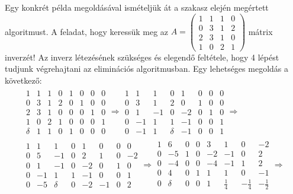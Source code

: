 \documentclass[9pt, a4paper, showtrims]{memoir}
\theoremstyle{plain}
\theoremstyle{remark}
\theoremstyle{definition}
\begin{document}
Egy konkrét példa megoldásával ismételjük át a szakasz elején megértett algoritmust.
A feladat, hogy keressük meg az 
\(
A=
\begin{pmatrix}
    1&1&1&0\\
    0&3&1&2\\
    2&3&1&0\\
    1&0&2&1
\end{pmatrix}
\)
mátrix inverzét!
Az inverz létezésének szükséges és elegendő feltétele, hogy 4 lépést tudjunk végrehajtani az eliminációs algoritmusban.
Egy lehetséges megoldás a következő:
\begin{multline*}
    \begin{array}{cccc|cccc}
        \boxed{1}&1&1&0 & 1&0&0&0\\
        0&3&1&2 & 0&1&0&0\\
        2&3&1&0 & 0&0&1&0\\
        1&0&2&1 & 0&0&0&1\\
        \hline
        \delta&1&1&0&1&0&0&0
    \end{array}\Rightarrow
    \begin{array}{cccc|cccc}
        1&1&1&0 & 1&0&0&0\\
        0&3&1&2 & 0&1&0&0\\
        0&1&-1&0 & -2&0&1&0\\
        0&-1&1&\boxed{1} & -1&0&0&1\\
        \hline
        0&-1&1&\delta&-1&0&0&1
    \end{array}\Rightarrow
    \\
    \begin{array}{cccc|cccc}
        1&1&1&0 & 1&0&0&0\\
        0&5&\boxed{-1}&0 & 2&1&0&-2\\
        0&1&-1&0 & -2&0&1&0\\
        0&-1&1&1 & -1&0&0&1\\
        \hline
        0&-5&\delta&0&-2&-1&0&2
    \end{array}\Rightarrow
    \begin{array}{cccc|cccc}
        1&6&0&0 & 3&1&0&-2\\
        0&-5&1&0 & -2&-1&0&2\\
        0&\boxed{-4}&0&0 & -4&-1&1&2\\
        0&4&0&1 & 1&1&0&-1\\
        \hline
        0&\delta&0&0&1&\frac{1}{4}&-\frac{1}{4}&-\frac{1}{2}
    \end{array}\Rightarrow
    \\

\end{multline*}
\end{document}

